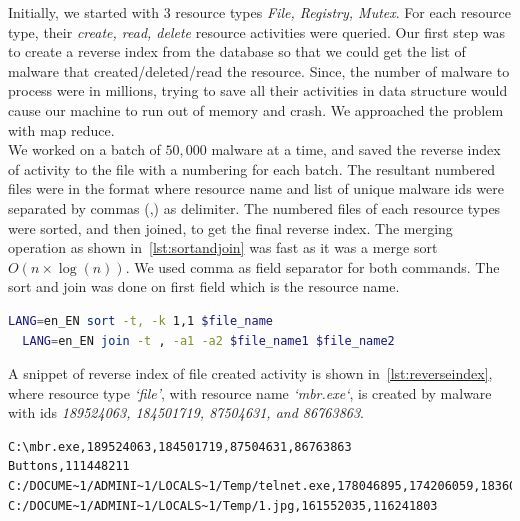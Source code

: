 Initially, we started with 3 resource types \textit{File, Registry, Mutex}.
For each resource type, their \textit{create, read, delete} resource activities were queried.
Our first step was to create a reverse index from the database so that we could get the list of malware that created/deleted/read the resource.
Since, the number of malware to process were in millions, trying to save all their activities in data structure would cause our machine to run out of memory and crash.
We approached the problem with map reduce.\\

We worked on a batch of $50,000$ malware at a time, and saved the reverse index of activity to the file with a numbering for each batch.
The resultant numbered files were in the format where resource name and list of unique malware ids were separated by commas (,) as delimiter.
The numbered files of each resource types were sorted, and then joined, to get the final reverse index.
The merging operation as shown in~\autoref{lst:sortandjoin} was fast as it was a merge sort $O( n \times \log(n))$.
We used comma as field separator for both commands. The sort and join was done on first field which is the resource name.
\begin{lstlisting}[numbers=none,language=bash,caption={Sort and join the reverse index},label={lst:sortandjoin}]
  LANG=en_EN sort -t, -k 1,1 $file_name
  LANG=en_EN join -t , -a1 -a2 $file_name1 $file_name2
\end{lstlisting}
A snippet of reverse index of file created activity is shown in~\autoref{lst:reverseindex}, where resource type \emph{`file'}, with resource name \emph{`mbr.exe`}, is created by malware with ids \emph{189524063, 184501719, 87504631, and 86763863}.
\begin{lstlisting}[numbers=none,caption={Sample of reverse index created for File activity},label={lst:reverseindex}]
C:\mbr.exe,189524063,184501719,87504631,86763863
Buttons,111448211
C:/DOCUME~1/ADMINI~1/LOCALS~1/Temp/telnet.exe,178046895,174206059,183601891,89650247
C:/DOCUME~1/ADMINI~1/LOCALS~1/Temp/1.jpg,161552035,116241803
\end{lstlisting}

